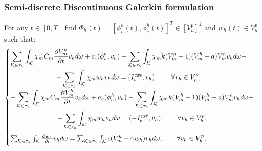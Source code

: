 \documentclass[9pt]{beamer}
\begin{document}
\begin{frame}
\frametitle{Semi-discrete Discontinuous Galerkin formulation}
For any $t\in[0,T]$ find $\Phi_h(t)=[\phi_i^h(t),\phi_e^h(t)]^T \in [V_h^p]^2$  and  $w_h(t) \in V_h^p$ such that:
\vspace{2mm}
    \begin{equation*}
    \begin{cases}
    \begin{gathered}
    \sum_{\mathcal{K} \in \tau_h} \int_{\mathcal{K}}{ \chi_m C_m \pdv{V_m^h}{t} v_h d\omega}+a_i(\phi_i^h,v_h)+\sum_{\mathcal{K} \in \tau_h} \int_{\mathcal{K}}{ \chi_m k (V_m^h-1)(V_m^h-a) V_m^h v_h d\omega}+\\
    +\sum_{\mathcal{K} \in \tau_h} \int_{\mathcal{K}}{ \chi_m w_h v_h d\omega}=(I_i^{ext},v_h), \qquad \forall v_h \in V_h^p,\\
    \end{gathered}\\
    \vspace{2mm}
    \begin{gathered}
    -\sum_{\mathcal{K} \in \tau_h} \int_{\mathcal{K}}{ \chi_m C_m \pdv{V_m^h}{t} v_h d\omega}+a_e(\phi_e^h,v_h)-\sum_{\mathcal{K} \in \tau_h} \int_{\mathcal{K}}{ \chi_m k (V_m^h-1)(V_m^h-a) V_m^h v_h d\omega}+\\
    -\sum_{\mathcal{K} \in \tau_h} \int_{\mathcal{K}}{ \chi_m w_h v_h d\omega}=(-I_e^{ext},v_h), \qquad \forall v_h \in V_h^p,\\
    \end{gathered}\\
    \vspace{2mm}
    \sum_{\mathcal{K} \in \tau_h} \int_{\mathcal{K}}{\pdv{w_h}{t}v_h d\omega}=\sum_{\mathcal{K} \in \tau_h} \int_{\mathcal{K}}{\epsilon (V_m^h-\gamma w_h) v_h d\omega}, \qquad \forall v_h \in V_h^p,\\
    \end{cases}
    \end{equation*}
\end{frame}
\end{document}
